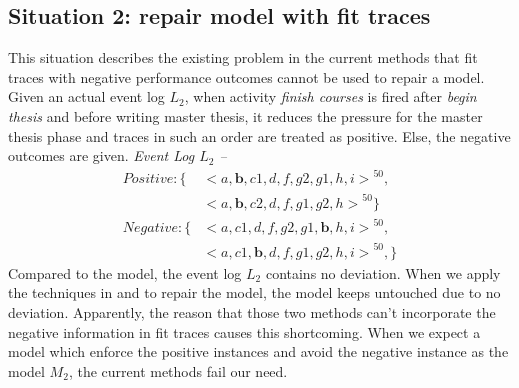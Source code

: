 \subsection{Situation 2: \small{repair model with fit traces}}
This situation describes the existing problem in the current methods that fit traces with negative performance outcomes cannot be used to repair a model. Given an actual event log $L_2$, when activity \emph{finish courses} is fired after \emph{begin thesis} and before writing master thesis, it reduces the pressure for the master thesis phase and traces in such an order are treated as positive. Else, the negative outcomes are given. 
\emph{Event Log $L_2$ -- }
\begin{align*}
Positive:\{ & { <a,\textbf{b},c1,d,f,g2,g1,h,i>}^{50}, \\   &{<a,\textbf{b},c2,d,f,g1,g2,h>}^{50} \}  \\
Negative: \{ & {<a,c1,d,f,g2,g1,\textbf{b},h,i>}^{50}, \\
& {<a,c1,\textbf{b},d,f,g1,g2,h,i>}^{50},  \}
\end{align*}
Compared to the model, the event log $L_2$ contains no deviation. When we apply the techniques in \cite{fahland2015model} and \cite{dees2017enhancing} to repair the model, the model keeps untouched due to no deviation. Apparently, the reason that those two methods can't incorporate the negative information in fit traces causes this shortcoming. When we expect a model which enforce the positive instances and avoid the negative instance as the model $M_2$, the current methods fail our need. 
